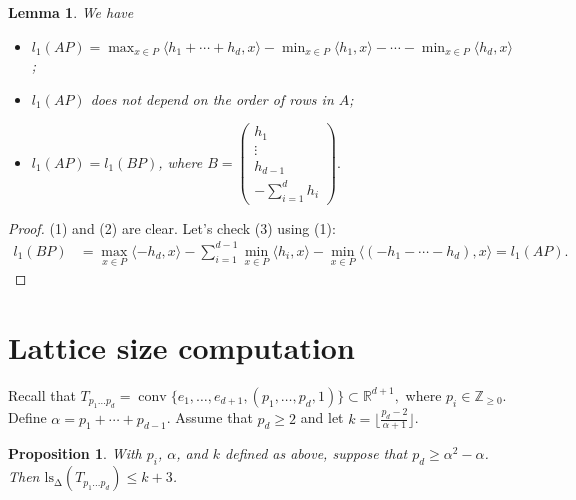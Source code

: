 \documentclass[11pt]{amsart}
\numberwithin{equation}{section}
\theoremstyle{plain}
\newtheorem{Proposition}[Theorem]{Proposition}
\newtheorem{Lemma}[Theorem]{Lemma}
\theoremstyle{definition}
\newcommand{\Z}{\mathbb Z}
\newcommand{\R}{\mathbb R}
\newcommand{\conv}{\operatorname{conv}}
\newcommand{\ls}{\operatorname{ls_\Delta}}
\begin{document}
\begin{Lemma}\label{L:IntroLemma2} We have
\begin{itemize} 
\item[(1)] 
$l_1(AP)=\max_{x\in P}\langle h_1+\cdots+h_d,x\rangle-\min_{x\in P}\langle h_1,x\rangle-\cdots-\min_{x\in P}\langle h_d,x\rangle$;
\item[(2)] $l_1(AP)$ does not depend on the order of rows in $A$;
\item[(3)] $
l_1(AP)=l_1(BP)$, where $B=\left(\begin{matrix}h_1\\ \vdots\\h_{d-1}\\
-\sum_{i=1}^d h_i
\end{matrix}\right).
$
\end{itemize}
\end{Lemma}

\begin{proof} (1) and (2) are clear.
Let's check (3) using (1):
\begin{align*}
l_1\left(BP\right)&=\max\limits_{x\in P}\langle-h_d,x\rangle
-\sum_{i=1}^{d-1}\min\limits_{x\in P}\langle h_i,x\rangle
-\min\limits_{x\in P}\langle(-h_1-\cdots-h_d),x\rangle
=l_1(AP).
\end{align*}

\end{proof}




\section{Lattice size computation}
Recall that 
$T_{p_1\dots p_d}=\conv\{e_1,\dots, e_{d+1}, (p_1,\dots, p_d,1)\}\subset\R^{d+1}, 
$
where $p_i\in\Z_{\geq 0}$. Define $\alpha=p_1+\cdots+p_{d-1}$. Assume that $p_d\geq 2$ and let $k=\lfloor\frac{p_d-2}{\alpha+1}\rfloor$.



\begin{Proposition}\label{P: upper_bound} With $p_i$, $\alpha$, and $k$  defined as above, suppose that $p_d\geq \alpha^2-\alpha$. Then
$\ls(T_{p_1 \dots p_d})\leq k+3$.
\end{Proposition}
\end{document}
